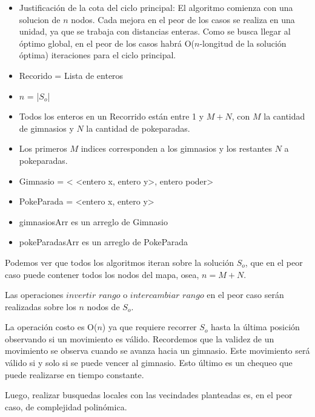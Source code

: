 \begin{algorithm}[H]


\end{algorithm}

\begin{itemize}
\item Justificación de la cota del ciclo principal: El algoritmo comienza con una solucion de $n$ nodos. Cada mejora en el peor de los casos se realiza en una unidad, ya que se trabaja con distancias enteras. Como se busca llegar al óptimo global, en el peor de los casos habrá O($n$-longitud de la solución óptima) iteraciones para el ciclo principal.
\item Recorido = Lista de enteros
\item $n$ = |$S_o$|
\item Todos los enteros en un Recorrido están entre 1 y $M+N$, con $M$ la cantidad de gimnasios y $N$ la cantidad de pokeparadas.
\item Los primeros $M$ indices corresponden a los gimnasios y los restantes $N$ a pokeparadas.
\item Gimnasio = < <entero x, entero y>, entero poder>
\item PokeParada = <entero x, entero y>
\item gimnasiosArr es un arreglo de Gimnasio
\item pokeParadasArr es un arreglo de PokeParada
\end{itemize}

Podemos ver que todos los algoritmos iteran sobre la solución $S_o$, que en el peor caso puede contener todos los nodos del mapa, osea, $n=M+N$.

Las operaciones $invertir$ $rango$ o $intercambiar$ $rango$ en el peor caso serán realizadas sobre los $n$ nodos de $S_o$.

La operación costo es O($n$) ya que requiere recorrer $S_o$ hasta la última posición observando si un movimiento es válido. Recordemos que la validez de un movimiento se observa cuando se avanza hacia un gimnasio. Este movimiento será válido si y solo si se puede vencer al gimnasio. Esto último es un chequeo que puede realizarse en tiempo constante.  

Luego, realizar busquedas locales con las vecindades planteadas es, en el peor caso, de complejidad polinómica. 
